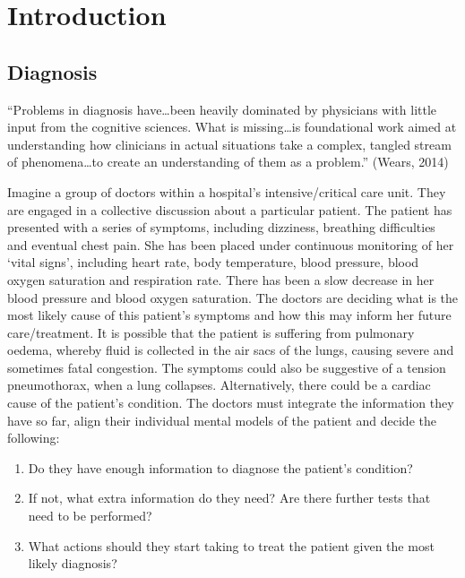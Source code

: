 \documentclass[a4paper, nobind]{templates/ociamthesis}
\providecommand{\tightlist}{%
  \setlength{\itemsep}{0pt}\setlength{\parskip}{0pt}}
\begin{document}
\chapter*{Introduction}\label{introduction}

\adjustmtc
{}

\section*{Diagnosis}\label{diagnosis}

``Problems in diagnosis have\ldots been heavily dominated by physicians with little input from the cognitive sciences. What is missing\ldots is foundational work aimed at understanding how clinicians in actual situations take a complex, tangled stream of phenomena\ldots to create an understanding of them as a problem.'' (Wears, 2014)

Imagine a group of doctors within a hospital's intensive/critical care unit. They are engaged in a collective discussion about a particular patient. The patient has presented with a series of symptoms, including dizziness, breathing difficulties and eventual chest pain. She has been placed under continuous monitoring of her `vital signs', including heart rate, body temperature, blood pressure, blood oxygen saturation and respiration rate. There has been a slow decrease in her blood pressure and blood oxygen saturation. The doctors are deciding what is the most likely cause of this patient's symptoms and how this may inform her future care/treatment. It is possible that the patient is suffering from pulmonary oedema, whereby fluid is collected in the air sacs of the lungs, causing severe and sometimes fatal congestion. The symptoms could also be suggestive of a tension pneumothorax, when a lung collapses. Alternatively, there could be a cardiac cause of the patient's condition. The doctors must integrate the information they have so far, align their individual mental models of the patient and decide the following:

\begin{enumerate}
\def\labelenumi{\arabic{enumi}.}
\tightlist
\item
  Do they have enough information to diagnose the patient's condition?
\item
  If not, what extra information do they need? Are there further tests that need to be performed?
\item
  What actions should they start taking to treat the patient given the most likely diagnosis?
\end{enumerate}
\end{document}
